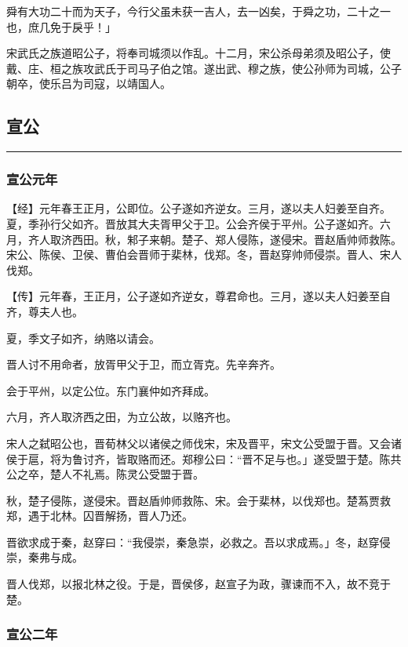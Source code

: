 \documentclass[]{article}
\begin{document}
舜有大功二十而为天子，今行父虽未获一吉人，去一凶矣，于舜之功，二十之一也，庶几免于戾乎！」

宋武氏之族道昭公子，将奉司城须以作乱。十二月，宋公杀母弟须及昭公子，使戴、庄、桓之族攻武氏于司马子伯之馆。遂出武、穆之族，使公孙师为司城，公子朝卒，使乐吕为司寇，以靖国人。

\hypertarget{header-n1291}{%
\subsection{宣公}\label{header-n1291}}

\begin{center}\rule{0.5\linewidth}{\linethickness}\end{center}

\hypertarget{header-n1293}{%
\subsubsection{宣公元年}\label{header-n1293}}

【经】元年春王正月，公即位。公子遂如齐逆女。三月，遂以夫人妇姜至自齐。夏，季孙行父如齐。晋放其大夫胥甲父于卫。公会齐侯于平州。公子遂如齐。六月，齐人取济西田。秋，邾子来朝。楚子、郑人侵陈，遂侵宋。晋赵盾帅师救陈。宋公、陈侯、卫侯、曹伯会晋师于棐林，伐郑。冬，晋赵穿帅师侵崇。晋人、宋人伐郑。

【传】元年春，王正月，公子遂如齐逆女，尊君命也。三月，遂以夫人妇姜至自齐，尊夫人也。

夏，季文子如齐，纳赂以请会。

晋人讨不用命者，放胥甲父于卫，而立胥克。先辛奔齐。

会于平州，以定公位。东门襄仲如齐拜成。

六月，齐人取济西之田，为立公故，以赂齐也。

宋人之弑昭公也，晋荀林父以诸侯之师伐宋，宋及晋平，宋文公受盟于晋。又会诸侯于扈，将为鲁讨齐，皆取赂而还。郑穆公曰：``晋不足与也。」遂受盟于楚。陈共公之卒，楚人不礼焉。陈灵公受盟于晋。

秋，楚子侵陈，遂侵宋。晋赵盾帅师救陈、宋。会于棐林，以伐郑也。楚蒍贾救郑，遇于北林。囚晋解扬，晋人乃还。

晋欲求成于秦，赵穿曰：``我侵崇，秦急崇，必救之。吾以求成焉。」冬，赵穿侵崇，秦弗与成。

晋人伐郑，以报北林之役。于是，晋侯侈，赵宣子为政，骤谏而不入，故不竞于楚。

\hypertarget{header-n1306}{%
\subsubsection{宣公二年}\label{header-n1306}}
\end{document}
